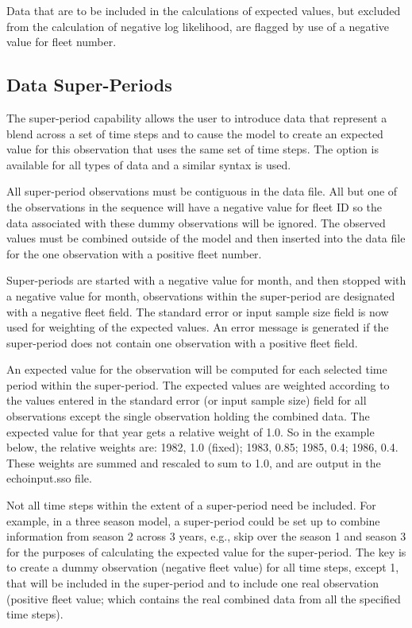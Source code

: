Data that are to be included in the calculations of expected values, but excluded from the calculation of negative log likelihood, are flagged by use of a negative value for fleet number.

\hypertarget{SuperPeriod}{}
\subsection{Data Super-Periods}
The super-period capability allows the user to introduce data that represent a blend across a set of time steps and to cause the model to create an expected value for this observation that uses the same set of time steps. The option is available for all types of data and a similar syntax is used. 

All super-period observations must be contiguous in the data file. All but one of the observations in the sequence will have a negative value for fleet ID so the data associated with these dummy observations will be ignored. The observed values must be combined outside of the model and then inserted into the data file for the one observation with a positive fleet number.

Super-periods are started with a negative value for month, and then stopped with a negative value for month,  observations within the super-period are designated with a negative fleet field. The standard error or input sample size field is now used for weighting of the expected values. An error message is generated if the super-period does not contain one observation with a positive fleet field.

An expected value for the observation will be computed for each selected time period within the super-period.  The expected values are weighted according to the values entered in the standard error (or input sample size) field for all observations except the single observation holding the combined data.  The expected value for that year gets a relative weight of 1.0.  So in the example below, the relative weights are: 1982, 1.0 (fixed); 1983, 0.85; 1985, 0.4; 1986, 0.4.  These weights are summed and rescaled to sum to 1.0, and are output in the echoinput.sso file.

Not all time steps within the extent of a super-period need be included. For example, in a three season model, a super-period could be set up to combine information from season 2 across 3 years, e.g., skip over the season 1 and season 3 for the purposes of calculating the expected value for the super-period. The key is to create a dummy observation (negative fleet value) for all time steps, except 1, that will be included in the super-period and to include one real observation (positive fleet value; which contains the real combined data from all the specified time steps).

